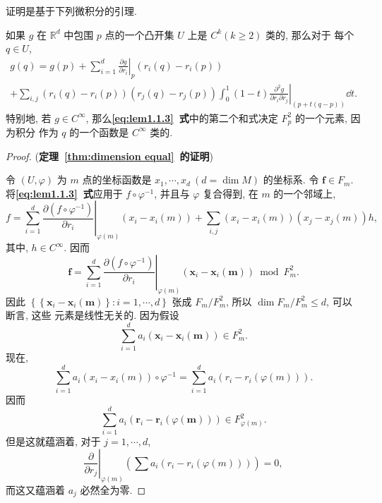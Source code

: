 证明是基于下列微积分的引理.
\begin{lem}
如果 $g$ 在 $\mathbb{R}^d$ 中包围 $p$ 点的一个凸开集 $U$ 上是 $C^k(k \geqslant 2)$ 类的, 那么对于 每个 $q \in U$,
\begin{multline}\label{eq:lem1.1.3}
g(q)= g(p)+\left.\sum_{i=1}^d \frac{\partial g}{\partial r_i}\right|_p\left(r_i(q)-r_i(p)\right) \\
 +\left.\sum_{i, j}\left(r_i(q)-r_i(p)\right)\left(r_j(q)-r_j(p)\right) \int_0^1(1-t) \frac{\partial^2 g}{\partial r_i \partial r_j}\right|_{(p+t(q-p))} \dd t .
\end{multline}
特别地, 若 $g \in C^{\infty}$, 那么\textbf{\eqref{eq:lem1.1.3}~式}中的第二个和式决定 $F_p^2$ 的一个元素, 因为积分 作为 $q$ 的一个函数是 $C^{\infty}$ 类的.
\end{lem}
\begin{proof}{(\textbf{定理~\ref{thm:dimension equal}~的证明})}

令 $(U, \varphi)$ 为 $m$ 点的坐标函数是 $x_1, \cdots, x_d ~(d=\dim M)$ 的坐标系. 令 $\mathbf{f} \in F_m$. 将\textbf{\eqref{eq:lem1.1.3}~式}应用于 $f \circ \varphi^{-1}$, 并且与 $\varphi$ 复合得到, 在 $m$ 的一个邻域上,
$$
f=\left.\sum_{i=1}^d \frac{\partial\left(f \circ \varphi^{-1}\right)}{\partial r_i}\right|_{\varphi(m)}\left(x_i-x_i(m)\right)+\sum_{i, j}\left(x_i-x_i(m)\right)\left(x_j-x_j(m)\right) h,
$$
其中, $h \in C^{\infty}$. 因而
$$
\mathbf{f}=\left.\sum_{i=1}^d \frac{\partial\left(f \circ \varphi^{-1}\right)}{\partial r_i}\right|_{\varphi(m)}\left(\mathbf{x}_i-\mathbf{x}_i(\mathbf{m})\right) \bmod F_m^2 .
$$
因此 $\left\{\left\{\mathbf{x}_i-\mathbf{x}_i(\mathbf{m})\right\}: i=1, \cdots, d\right\}$ 张成 $F_m / F_m^2$, 所以 $\operatorname{dim} F_m / F_m^2 \leqslant d$, 可以断言, 这些 元素是线性无关的. 因为假设
$$
\sum_{i=1}^d a_i\left(\mathbf{x}_i-\mathbf{x}_i(\mathbf{m})\right) \in F_m^2 .
$$
现在,
$$
\sum_{i=1}^d a_i\left(x_i-x_i(m)\right) \circ \varphi^{-1}=\sum_{i=1}^d a_i\left(r_i-r_i(\varphi(m))\right) .
$$
因而
$$
\sum_{i=1}^d a_i\left(\mathbf{r}_i-\mathbf{r}_i(\varphi(\mathbf{m}))\right) \in F_{\varphi(m)}^2 .
$$
但是这就蕴涵着, 对于 $j=1, \cdots, d$,
$$
\left.\frac{\partial}{\partial r_j}\right|_{\varphi(m)}\left(\sum a_i\left(r_i-r_i(\varphi(m))\right)\right)=0,
$$
而这又蕴涵着 $a_j$ 必然全为零.
\end{proof}

